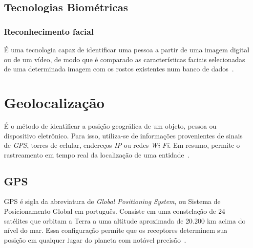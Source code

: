 \subsection{Tecnologias Biométricas}\label{subsec:biometria-tecnologias}

\subsubsection{Reconhecimento facial}\label{subsubsec:reconhecimento-facial}
É uma tecnologia capaz de identificar uma pessoa a partir de uma imagem digital ou de um vídeo, de modo que é comparado as características faciais selecionadas de uma determinada imagem com os rostos existentes num banco de dados~\cite{orvalho2019reconhecimento}.




\section{Geolocalização}\label{sec:geolocalizacao}
É o método de identificar a posição geográfica de um objeto, pessoa ou dispositivo eletrônico.
Para isso, utiliza-se de informações provenientes de sinais de \textit{GPS}, torres de celular, endereços \textit{IP} ou redes  \textit{Wi-Fi}.
Em resumo, permite o rastreamento em tempo real da localização de uma entidade~\cite{da2019sistemas}.

\subsection{GPS}\label{subsec:gps}
GPS é sigla da abreviatura de \textit{Global Positioning System}, ou Sistema de Posicionamento Global em português.
Consiste em uma constelação de 24 satélites que orbitam a Terra a uma altitude aproximada de 20.200 km acima do nível do mar.
Essa configuração permite que os receptores determinem sua posição em qualquer lugar do planeta com notável precisão~\cite{alves2006matematica}.

